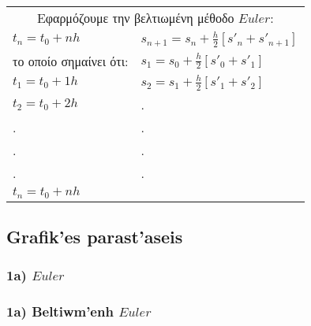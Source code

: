 \documentclass[a4paper]{article}
\begin{document}
        \vspace{70pt}

        \begin{tabular}{l|l}
            \multicolumn{2}{c}{Εφαρμόζουμε την βελτιωμένη μέθοδο $Euler$: }\\
            $t_n=t_0+nh$ & $s_{n+1}=s_n+\frac{h}{2}[s'_n+s'_{n+1}]$\\
            το οποίο σημαίνει ότι:& $s_1=s_0+\frac{h}{2}[s'_0+s'_1]$\\
            $t_1=t_0+1h$          &$s_2=s_1+\frac{h}{2}[s'_1+s'_2]$ \\
            $t_2=t_0+2h$          & .\\
            .                     & .\\
            .                     & .\\
            .                     & .\\
            $t_n=t_0+nh$          &  \\
        \end{tabular}
        \subsection{Grafik'es parast'aseis}
        \subsubsection*{1a) $Euler$}
        \noindent{}
        \noindent{}
        \noindent{}
        \noindent{}
        \noindent{}
        \noindent{}
        \subsubsection*{1a) Beltiwm'enh $Euler$}
        \noindent{}
        
        \noindent{}
        \noindent{}
        \noindent{}
\end{document}
